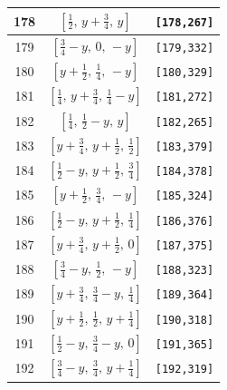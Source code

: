 \documentclass[fleqn,8pt]{jsarticle}
\begin{document}
\begin{longtable}{ccc}
178 & $\left[ \frac{1}{2},\, y + \frac{3}{4},\, y \right]$ & {\tt [178,267]} \\ \hline
179 & $\left[ \frac{3}{4} - y,\, 0,\, - y \right]$ & {\tt [179,332]} \\ \hline
180 & $\left[ y + \frac{1}{2},\, \frac{1}{4},\, - y \right]$ & {\tt [180,329]} \\ \hline
181 & $\left[ \frac{1}{4},\, y + \frac{3}{4},\, \frac{1}{4} - y \right]$ & {\tt [181,272]} \\ \hline
182 & $\left[ \frac{1}{4},\, \frac{1}{2} - y,\, y \right]$ & {\tt [182,265]} \\ \hline
183 & $\left[ y + \frac{3}{4},\, y + \frac{1}{2},\, \frac{1}{2} \right]$ & {\tt [183,379]} \\ \hline
184 & $\left[ \frac{1}{2} - y,\, y + \frac{1}{2},\, \frac{3}{4} \right]$ & {\tt [184,378]} \\ \hline
185 & $\left[ y + \frac{1}{2},\, \frac{3}{4},\, - y \right]$ & {\tt [185,324]} \\ \hline
186 & $\left[ \frac{1}{2} - y,\, y + \frac{1}{2},\, \frac{1}{4} \right]$ & {\tt [186,376]} \\ \hline
187 & $\left[ y + \frac{3}{4},\, y + \frac{1}{2},\, 0 \right]$ & {\tt [187,375]} \\ \hline
188 & $\left[ \frac{3}{4} - y,\, \frac{1}{2},\, - y \right]$ & {\tt [188,323]} \\ \hline
189 & $\left[ y + \frac{3}{4},\, \frac{3}{4} - y,\, \frac{1}{4} \right]$ & {\tt [189,364]} \\ \hline
190 & $\left[ y + \frac{1}{2},\, \frac{1}{2},\, y + \frac{1}{4} \right]$ & {\tt [190,318]} \\ \hline
191 & $\left[ \frac{1}{2} - y,\, \frac{3}{4} - y,\, 0 \right]$ & {\tt [191,365]} \\ \hline
192 & $\left[ \frac{3}{4} - y,\, \frac{3}{4},\, y + \frac{1}{4} \right]$ & {\tt [192,319]} \\
\end{longtable}
\renewcommand{\arraystretch}{1.2}
\end{document}
